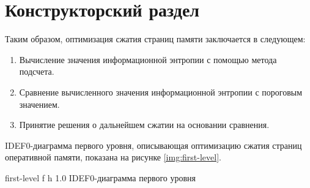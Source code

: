 \chapter{Конструкторский раздел}

Таким образом, оптимизация сжатия страниц памяти заключается в следующем:

\begin{enumerate}
	\item Вычисление значения информационной энтропии с помощью метода подсчета.
	\item Сравнение вычисленного значения информационной энтропии с пороговым значением.
	\item Принятие решения о дальнейшем сжатии на основании сравнения.
\end{enumerate}

IDEF0-диаграмма первого уровня, описывающая оптимизацию сжатия страниц оперативной памяти, показана на рисунке \ref{img:first-level}.
    
    {first-level}
    {f}
    {h}
    {1.0\textwidth}
    {IDEF0-диаграмма первого уровня}